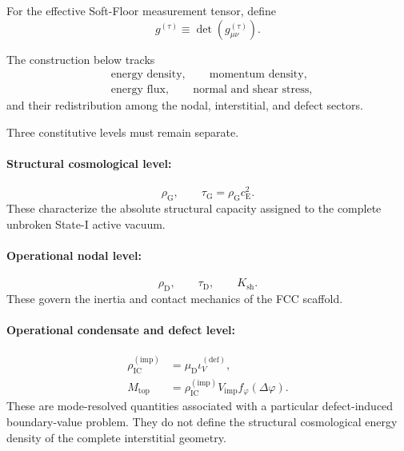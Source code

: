 For the effective Soft-Floor measurement tensor, define
\begin{equation}
    g^{(\tau)} \equiv \det\!\left(g_{\mu\nu}^{(\tau)}\right).
\end{equation}

The construction below tracks
\begin{equation}
\begin{aligned}
    &\text{energy density}, \qquad \text{momentum density}, \\
    &\text{energy flux}, \qquad \text{normal and shear stress},
\end{aligned}
\end{equation}
and their redistribution among the nodal, interstitial, and defect sectors.

Three constitutive levels must remain separate.

\paragraph{Structural cosmological level:}
\begin{equation}
    \rho_{\mathrm{G}}, \qquad \tau_{\mathrm{G}} = \rho_{\mathrm{G}}c_{\mathrm{E}}^2.
\end{equation}
These characterize the absolute structural capacity assigned to the complete unbroken State-I active vacuum.

\paragraph{Operational nodal level:}
\begin{equation}
    \rho_{\mathrm{D}}, \qquad \tau_{\mathrm{D}}, \qquad K_{\mathrm{sh}}.
\end{equation}
These govern the inertia and contact mechanics of the FCC scaffold.

\paragraph{Operational condensate and defect level:}
\begin{equation}
\begin{aligned}
    \rho_{\mathrm{IC}}^{(\mathrm{imp})} &= \mu_{\mathrm{D}}\iota_V^{(\mathrm{def})}, \\
    M_{\mathrm{top}} &= \rho_{\mathrm{IC}}^{(\mathrm{imp})} V_{\mathrm{imp}} f_{\varphi}(\Delta\varphi).
\end{aligned}
\end{equation}
These are mode-resolved quantities associated with a particular defect-induced boundary-value problem. They do not define the structural cosmological energy density of the complete interstitial geometry.

